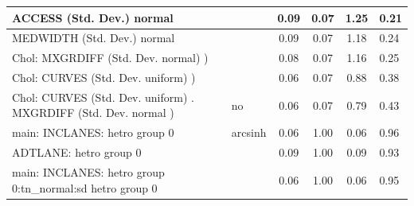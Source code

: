 \begin{table}
\begin{center}
\begin{tabular}{|l|l|c|c|c|l|}
			\hline
			ACCESS (Std. Dev.) normal &  & 0.09 & 0.07 & 1.25 & 0.21 \\
			\hline
			MEDWIDTH (Std. Dev.) normal &  & 0.09 & 0.07 & 1.18 & 0.24 \\
			\hline
			 Chol: MXGRDIFF (Std. Dev. normal) ) &  & 0.08 & 0.07 & 1.16 & 0.25 \\
			\hline
			 Chol: CURVES (Std. Dev. uniform) ) &  & 0.06 & 0.07 & 0.88 & 0.38 \\
			\hline
			 Chol: CURVES (Std. Dev. uniform) . MXGRDIFF (Std. Dev.   normal ) & no & 0.06 & 0.07 & 0.79 & 0.43 \\
			\hline
			main: INCLANES: hetro group 0 & arcsinh & 0.06 & 1.00 & 0.06 & 0.96 \\
			\hline
			ADTLANE: hetro group 0 &  & 0.09 & 1.00 & 0.09 & 0.93 \\
			\hline
			main: INCLANES: hetro group 0:tn_normal:sd  hetro group 0 &  & 0.06 & 1.00 & 0.06 & 0.95 \\
			\hline
		\end{tabular}
	\end{center}
\end{table}